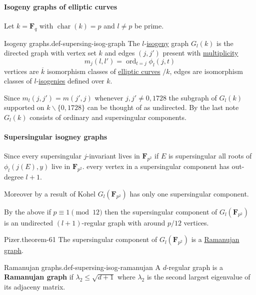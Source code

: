 \documentclass[10pt,]{book}
\newcommand{\terminology}[1]{\textbf{#1}}
\numberwithin{equation}{section}
\newcommand{\FF}{\mathbf{F}}
\DeclareMathOperator{\characteristic}{char}
\DeclareMathOperator{\ord}{ord}
\begin{document}
\paragraph[{Isogeny graphs of elliptic curves}]{Isogeny graphs of elliptic curves}\hypertarget{paragraphs-24}{}
\hypertarget{p-800}{}%
Let \(k = \FF_q\) with \(\characteristic(k) = p\) and \(l \ne p \) be prime.%
\begin{definition}{Isogeny graphs.}{def-supersing-isog-graph}%
\hypertarget{p-801}{}%
The \(l\)-\hyperref[def-supersing-isog-isog]{isogeny} graph \(G_l(k)\) is the directed graph with vertex set \(k\) and edges \((j,j')\) present with \hyperref[def-riem-order-vanish]{multiplicity}%
\begin{equation*}
m_j(l,l') = \ord_{t=j} \phi_l(j,t)
\end{equation*}
vertices are \(\overline k\) isomorphism classes of  \hyperref[def-supersing-isog-ec]{elliptic curves} \(/k\), edges are isomorphism classes of \(l\)-\hyperref[def-supersing-isog-isog]{isogenies} defined over \(k\).%
\end{definition}
\hypertarget{p-802}{}%
Since \(m_l(j,j') =  m(j',j)\) whenever \(j,j' \ne  0,1728\) the subgraph of \(G_l(k)\) supported on \(k\smallsetminus \{0,1728\}\) can be thought of as undirected. By the last note \(G_l(k)\) consists of ordinary and supersingular components.%
%
%
\typeout{************************************************}
\typeout{************************************************}
%
\paragraph[{Supersingular isogney graphs}]{Supersingular isogney graphs}\hypertarget{paragraphs-25}{}
\hypertarget{p-803}{}%
Since every supersingular \(j\)-invariant lives in \(\FF_{p^2}\) if \(E\) is supersingular all roots of \(\phi_l(j(E), y)\) live in \(\FF_{p^2}\). every vertex in a supersingular component has out-degree \(l+1\).%
\par
\hypertarget{p-804}{}%
Moreover by a result of Kohel \(G_l(\FF_{p^2})\) has only one supersingular component.%
\par
\hypertarget{p-805}{}%
By the above if \(p \equiv 1 \pmod {12}\) then the supersingular component of \(G_l(\FF_{p^2})\) is an undirected \((l+1)\)-regular graph with around \(p/12\) vertices.%
\begin{theorem}{Pizer.}{}{theorem-61}%
\hypertarget{p-806}{}%
The supersingular component of \(G_l(\FF_{p^2})\) is a \hyperref[def-supersing-isog-ramanujan]{Ramanujan graph}.%
\end{theorem}
\begin{definition}{Ramanujan graphs.}{def-supersing-isog-ramanujan}%
\hypertarget{p-807}{}%
A \(d\)-regular graph is a \terminology{Ramanujan graph} if \(\lambda_2 \le \sqrt{d+1}\) where \(\lambda_2\) is the second largest eigenvalue of its adjaceny matrix.%
\end{definition}
%
%
\typeout{************************************************}
\typeout{************************************************}
%
\end{document}
